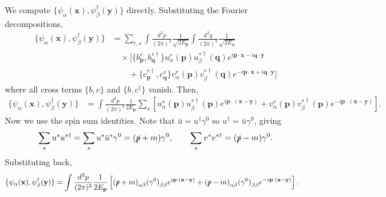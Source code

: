 \begin{solution}
    We compute $\{\psi_\alpha(\mathbf{x}), \psi^\dagger_\beta(\mathbf{y})\}$ directly. Substituting the Fourier decompositions,
    \begin{equation}
    \begin{aligned}
        \{\psi_\alpha(\mathbf{x}), \psi^\dagger_\beta(\mathbf{y})\} &= \sum_{r,s}\int\frac{d^3p}{(2\pi)^3}\frac{1}{\sqrt{2E_\mathbf{p}}}\int\frac{d^3q}{(2\pi)^3}\frac{1}{\sqrt{2E_\mathbf{q}}}\\
        &\quad\times\bigg[\{b^r_\mathbf{p}, b^{s\dagger}_\mathbf{q}\}u^r_\alpha(\mathbf{p})u^{s\dagger}_\beta(\mathbf{q})e^{i\mathbf{p}\cdot\mathbf{x}-i\mathbf{q}\cdot\mathbf{y}}\\
        &\qquad + \{c^{r\dagger}_\mathbf{p}, c^s_\mathbf{q}\}v^r_\alpha(\mathbf{p})v^{s\dagger}_\beta(\mathbf{q})e^{-i\mathbf{p}\cdot\mathbf{x}+i\mathbf{q}\cdot\mathbf{y}}\bigg]
    \end{aligned}
    \end{equation}
    where all cross terms $\{b,c\}$ and $\{b,c^\dagger\}$ vanish. Then,
    \begin{equation}
    \begin{aligned}
        \{\psi_\alpha(\mathbf{x}), \psi^\dagger_\beta(\mathbf{y})\} &= \int\frac{d^3p}{(2\pi)^3}\frac{1}{2E_\mathbf{p}}\sum_s\left[u^s_\alpha(\mathbf{p})u^{s\dagger}_\beta(\mathbf{p})e^{i\mathbf{p}\cdot(\mathbf{x}-\mathbf{y})} + v^s_\alpha(\mathbf{p})v^{s\dagger}_\beta(\mathbf{p})e^{-i\mathbf{p}\cdot(\mathbf{x}-\mathbf{y})}\right].
    \end{aligned}
    \end{equation}
    Now we use the spin sum identities. Note that $\bar{u} = u^\dagger\gamma^0$ so $u^\dagger = \bar{u}\gamma^0$, giving
    \begin{equation}
        \sum_s u^s u^{s\dagger} = \sum_s u^s\bar{u}^s\gamma^0 = (\slashed{p}+m)\gamma^0, \qquad \sum_s v^s v^{s\dagger} = (\slashed{p}-m)\gamma^0.
    \end{equation}
    Substituting back,
    \begin{equation}
    \begin{aligned}
        \{\psi_\alpha(\mathbf{x}), \psi^\dagger_\beta(\mathbf{y})\} &= \int\frac{d^3p}{(2\pi)^3}\frac{1}{2E_\mathbf{p}}\left[(\slashed{p}+m)_{\alpha\dot\beta}(\gamma^0)_{\dot\beta\beta}e^{i\mathbf{p}\cdot(\mathbf{x}-\mathbf{y})} + (\slashed{p}-m)_{\alpha\dot\beta}(\gamma^0)_{\dot\beta\beta}e^{-i\mathbf{p}\cdot(\mathbf{x}-\mathbf{y})}\right].
    \end{aligned}

\end{equation}
\end{solution}
